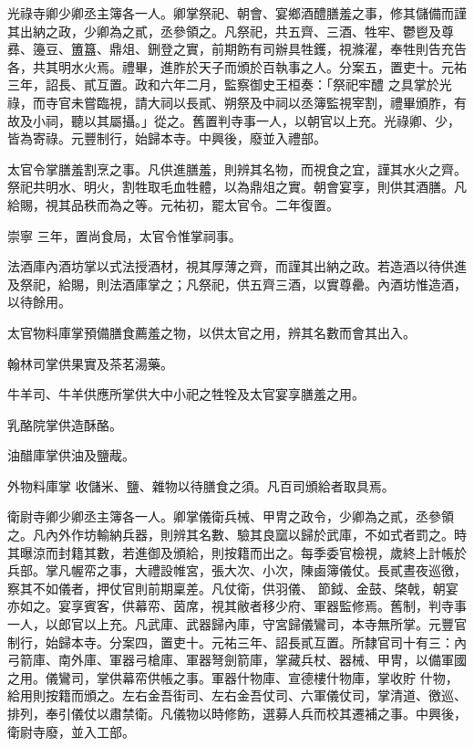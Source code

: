 \begin{pinyinscope}
 光祿寺卿少卿丞主簿各一人。卿掌祭祀、朝會、宴鄉酒醴膳羞之事，修其儲備而謹其出納之政，少卿為之貳，丞參領之。凡祭祀，共五齊、三酒、牲牢、鬱鬯及尊彞、籩豆、簠簋、鼎俎、鉶登之實，前期飭有司辦具牲鑊，視滌濯，奉牲則告充告各，共其明水火焉。禮畢，進胙於天子而頒於百執事之人。分案五，置吏十。元祐三年，詔長、貳互置。政和六年二月，監察御史王桓奏：「祭祀牢醴
 之具掌於光祿，而寺官未嘗臨視，請大祠以長貳、朔祭及中祠以丞簿監視宰割，禮畢頒胙，有故及小祠，聽以其屬攝。」從之。舊置判寺事一人，以朝官以上充。光祿卿、少，皆為寄祿。元豐制行，始歸本寺。中興後，廢並入禮部。



 太官令掌膳羞割烹之事。凡供進膳羞，則辨其名物，而視食之宜，謹其水火之齊。祭祀共明水、明火，割牲取毛血牲體，以為鼎俎之實。朝會宴享，則供其酒膳。凡給賜，視其品秩而為之等。元祐初，罷太官令。二年復置。



 崇寧
 三年，置尚食局，太官令惟掌祠事。



 法酒庫內酒坊掌以式法授酒材，視其厚薄之齊，而謹其出納之政。若造酒以待供進及祭祀，給賜，則法酒庫掌之；凡祭祀，供五齊三酒，以實尊罍。內酒坊惟造酒，以待餘用。



 太官物料庫掌預備膳食薦羞之物，以供太官之用，辨其名數而會其出入。



 翰林司掌供果實及茶茗湯藥。



 牛羊司、牛羊供應所掌供大中小祀之牲牷及太官宴享膳羞之用。



 乳酪院掌供造酥酪。



 油醋庫掌供油及鹽胾。



 外物料庫掌
 收儲米、鹽、雜物以待膳食之須。凡百司頒給者取具焉。



 衛尉寺卿少卿丞主簿各一人。卿掌儀衛兵械、甲冑之政令，少卿為之貳，丞參領之。凡內外作坊輸納兵器，則辨其名數、驗其良窳以歸於武庫，不如式者罰之。時其曝涼而封籍其數，若進御及頒給，則按籍而出之。每季委官檢視，歲終上計帳於兵部。掌凡幄帟之事，大禮設帷宮，張大次、小次，陳鹵簿儀仗。長貳晝夜巡徼，察其不如儀者，押仗官則前期稟差。凡仗衛，供羽儀、
 節鉞、金鼓、棨戟，朝宴亦如之。宴享賓客，供幕帟、茵席，視其敝者移少府、軍器監修焉。舊制，判寺事一人，以郎官以上充。凡武庫、武器歸內庫，守宮歸儀鸞司，本寺無所掌。元豐官制行，始歸本寺。分案四，置吏十。元祐三年、詔長貳互置。所隸官司十有三：內弓箭庫、南外庫、軍器弓槍庫、軍器弩劍箭庫，掌藏兵杖、器械、甲冑，以備軍國之用。儀鸞司，掌供幕帟供帳之事。軍器什物庫、宣德樓什物庫，掌收貯
 什物，給用則按籍而頒之。左右金吾街司、左右金吾仗司、六軍儀仗司，掌清道、徼巡、排列，奉引儀仗以肅禁衛。凡儀物以時修飭，選募人兵而校其遷補之事。中興後，衛尉寺廢，並入工部。




\end{pinyinscope}
